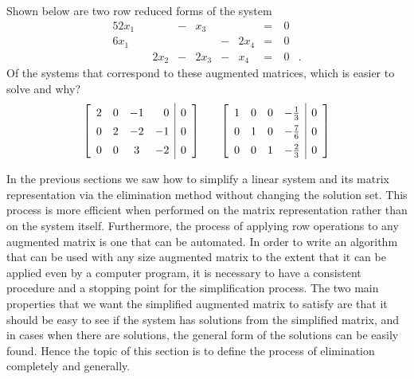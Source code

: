 \begin{pa}
\begin{enumerate}[i.]
	\end{enumerate}
	
	\item Shown below are two row reduced forms of the system 
	\begin{alignat*}{5}
{2}x_1 	&{}		&{}		&{}-{}	&{}x_3	&{}		&{} 			&{}={}	& \ 0&{}   \\
{6}x_1	&{} 		&{} 		&{}		&{}		&{}-{}	&{2}x_4 	&{}={} 	& \ 0&{} \\
{}			&{}		&{2}x_2	&{}-{} 	&{2}x_3	&{}-{}	&{}x_4		&{}={} 	& \ 0&{.}
\end{alignat*} 
Of the systems that correspond to these augmented matrices, which is easier to solve and why?
\[\left[ \begin{array}{cccr|c} 2 & 0 & -1 & 0 & 0 \\ 0 & 2 & -2 & -1 & 0 \\ 0 & 0 & 3 & -2 & 0 \end{array} \right] \hspace{0.25in} \left[ \renewcommand{\arraystretch}{1.4} \begin{array}{cccr|c} 1 & 0 & 0 & -\frac{1}{3} & 0 \\ 0 & 1 & 0 & -\frac{7}{6} & 0 \\ 0 & 0 & 1 & -\frac{2}{3} & 0 \end{array} \right]\]	

\ee

\end{pa}



In the previous sections we saw how to simplify a linear system and its matrix representation via the elimination method without changing the solution set. This process is more efficient when performed on the matrix representation rather than on the system itself. Furthermore, the process of applying row operations to any augmented matrix is one that can be automated. In order to write an algorithm that can be used with any size augmented matrix to the extent that it can be applied even by a computer program, it is necessary to have a consistent procedure and a stopping point for the simplification process. The two main properties that we want the simplified augmented matrix to satisfy are that it should be easy to see if the system has solutions from the simplified matrix, and in cases when there are solutions, the general form of the solutions can be easily found. Hence the topic of this section is to define the process of elimination completely and generally.

